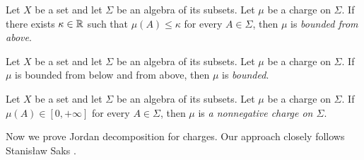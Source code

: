\begin{definition}
    Let $X$ be a set and let $\Sigma$ be an algebra of its subsets. Let $\mu$ be a charge on $\Sigma$. If there exists $\kappa \in {\mathbb R}$ such that $\mu(A) \leq
        \kappa$ for every $A \in \Sigma$, then $\mu$ is \textit{bounded from above}.
\end{definition}

\begin{definition}
    Let $X$ be a set and let $\Sigma$ be an algebra of its subsets. Let $\mu$ be a charge on $\Sigma$. If $\mu$ is bounded from below and from above, then $\mu$ is \textit{bounded}.
\end{definition}

\begin{definition}
    Let $X$ be a set and let $\Sigma$ be an algebra of its subsets. Let $\mu$ be a charge on $\Sigma$. If $\mu(A) \in [0,+\infty]$ for every $A \in \Sigma$, then $\mu$ is \textit{a nonnegative charge on $\Sigma$}.
\end{definition}
\noindent
Now we prove Jordan decomposition for charges. Our approach closely follows Stanis{\l}aw Saks \cite{saks1937theory}.

